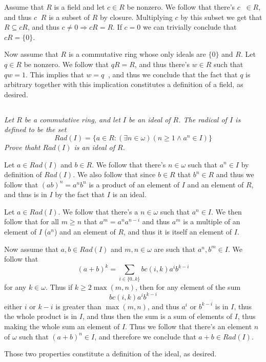 \documentclass[11pt,oneside,titlepage]{book}
\DeclareMathOperator \inv {^{-1}}
\DeclareMathOperator \ra {\Rightarrow}
\newcommand{\set}[1]{\{ #1 \}}
\begin{document}
Assume that $R$ is a field and let $c \in R$ be nonzero. We follow that
there's $c\inv \in R$, and thus $c\inv R$ is a subset of $R$ by closure. Multiplying
$c$ by this subset we get that $R \subseteq cR$, and thus $c \neq 0 \ra cR = R$.
If $c = 0$ we can trivially conclude that $cR = \set{0}$.

Now assume that $R$ is a commutative ring whose only ideals are
$\set{0}$ and $R$. Let $q \in R$ be nonzero. We follow that $qR = R$,
and thus there's $w \in R$ such that $qw = 1$. This implies that $w =
q\inv$, and thus we conclude that the fact that $q$ is arbitrary
together with this implication constitutes a definition of a field,
as desired.

\subsection{}

\textit{Let $R$ be a commutative ring, and let $I$ be an ideal of $R$. The radical of $I$
  is defined to be the set
  $$Rad(I) = \set{a \in R: (\exists n \in \omega)(n \geq 1 \land a^n \in I)}$$
  Prove thaht $Rad(I)$ is an ideal of $R$.
}

Let $a \in Rad(I)$ and $b \in R$. We follow that there's $n \in \omega$ such that $a^n \in I$
by definition of $Rad(I)$. We also follow that since $b \in R$ that $b^n \in R$ and thus
we follow that $(ab)^n = a^n b^n$ is a product of an element of $I$ and an element of $R$, and
thus is in $I$ by the fact that $I$ is an ideal.


Let $a \in Rad(I)$. We follow that there's a $n \in \omega$ such that
$a^n \in I$. We then follow that for all $m \geq n$ that
$a^m = a^n a^{n - i}$ and thus $a^m$ is a multiple of an element of $I$ ($a^n$)
and an element of $R$, and thus it is itself an element of $I$.

Now assume that $a, b \in Rad(I)$ and $m, n \in \omega$ are such that
$a^n, b^m \in I$. We follow that
$$(a + b)^k = \sum_{i \in \set{0..k}}{bc(i, k)a^i b^{k - i}}$$
for any $k \in \omega$. Thus if $k \geq 2\max(m, n)$, then for any
element of the sum
$$bc(i, k)a^i b^{k - i}$$
either $i$ or $k - i$ is greater than $\max(m, n)$, and thus $a^i$ or
$b^{k - i}$ is in $I$, thus the whole product is in $I$, and thus then
the sum is a sum of elements of $I$, thus making the whole sum an
element of $I$. Thus we follow that there's an element $n$ of $\omega$
such that $(a + b)^n \in I$, and therefore we conclude that $a + b \in
Rad(I)$.

Those two properties constitute a definition of the ideal, as desired.
\end{document}
